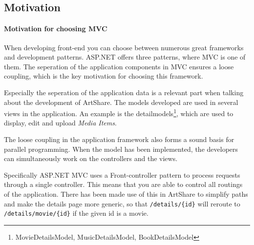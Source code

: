 \documentclass[../report.tex]{subfiles}
\begin{document}



\subsection{Motivation}

\paragraph{Motivation for choosing MVC}
When developing front-end you can choose between numerous great frameworks and development patterns. ASP.NET offers three patterns, where MVC is one of them. The seperation of the application components in MVC ensures a loose coupling, which is the key motivation for choosing this framework.

Especially the seperation of the application data is a relevant part when talking about the development of ArtShare. The models developed are used in several views in the application. An example is the detailmodels\footnote{MovieDetailsModel, MusicDetailsModel, BookDetailsModel}, which are used to display, edit and upload \textit{Media Items}.

The loose coupling in the application framework also forms a sound basis for parallel programming. When the model has been implemented, the developers can simultaneously work on the controllers and the views.

Specifically ASP.NET MVC uses a Front-controller pattern to process requests through a single controller. This means that you are able to control all routings of the application. There has been made use of this in ArtShare to simplify paths and make the details page more generic, so that \texttt{/details/\{id\}} will reroute to \texttt{/details/movie/\{id\}} if the given id is a movie.
\end{document}
